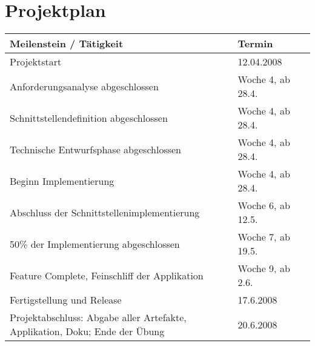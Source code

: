 

\section{Projektplan}
\begin{tabular}{ | p{11.2cm} | p{4cm} | l | }
\hline
\textbf{Meilenstein / Tätigkeit} & \textbf{Termin} \\
\hline
Projektstart & 12.04.2008\\
\hline
Anforderungsanalyse abgeschlossen & Woche 4, ab 28.4.\\
\hline
Schnittstellendefinition abgeschlossen  & Woche 4, ab 28.4.\\
\hline
Technische Entwurfsphase abgeschlossen & Woche 4, ab 28.4.\\
\hline
Beginn Implementierung & Woche 4, ab 28.4.\\
\hline
Abschluss der Schnittstellenimplementierung & Woche 6, ab 12.5.\\
\hline
50\% der Implementierung abgeschlossen & Woche 7, ab 19.5. \\
\hline
Feature Complete, Feinschliff der Applikation & Woche 9, ab 2.6.\\
\hline
Fertigstellung und Release & 17.6.2008 \\
\hline
Projektabschluss: Abgabe aller Artefakte, Applikation, Doku; Ende der Übung & 20.6.2008\\
\hline
\end{tabular}



